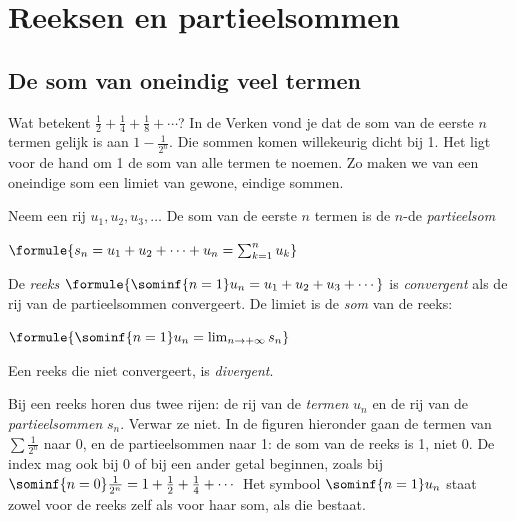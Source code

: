 \begin{oefeningen}[Start]

\end{oefeningen}


\section{Reeksen en partieelsommen}

\subsection{De som van oneindig veel termen}

Wat betekent $\tfrac12 + \tfrac14 + \tfrac18 + \cdots$? In de Verken vond je dat de som van de eerste $n$ termen gelijk is aan $1 - \tfrac{1}{2^n}$. Die sommen komen willekeurig dicht bij 1. Het ligt voor de hand om 1 de som van alle termen te noemen. Zo maken we van een oneindige som een limiet van gewone, eindige sommen.

\begin{theorie}
Neem een rij $u_1, u_2, u_3, \ldots$ De som van de eerste $n$ termen is de $n$-de \emph{partieelsom}

\vspace{1mm}
\qquad $\formule{s_n = u_1 + u_2 + \cdots + u_n = \sum_{k=1}^{n} u_k}$

\vspace{1mm}
De \emph{reeks} $\formule{\sominf{n=1} u_n = u_1 + u_2 + u_3 + \cdots}$ is \emph{convergent} als de rij van de partieelsommen convergeert. De limiet is de \emph{som} van de reeks:

\vspace{1mm}
\qquad $\formule{\sominf{n=1} u_n = \lim_{n\to+\infty} s_n}$

\vspace{1mm}
Een reeks die niet convergeert, is \emph{divergent}.
\end{theorie}

Bij een reeks horen dus twee rijen: de rij van de \textit{termen} $u_n$ en de rij van de \textit{partieelsommen} $s_n$. Verwar ze niet. In de figuren hieronder gaan de termen van $\sum \tfrac{1}{2^n}$ naar 0, en de partieelsommen naar 1: de som van de reeks is 1, niet 0. De index mag ook bij 0 of bij een ander getal beginnen, zoals bij $\sominf{n=0} \tfrac{1}{2^n} = 1 + \tfrac12 + \tfrac14 + \cdots$ Het symbool $\sominf{n=1} u_n$ staat zowel voor de reeks zelf als voor haar som, als die bestaat.

